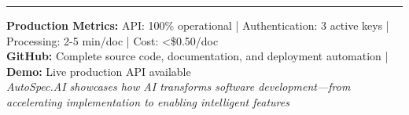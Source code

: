 \documentclass[11pt,letterpaper]{article}
\begin{document}
\vspace{6pt}
\hrule
\vspace{4pt}

\begin{center}
\small
\textbf{Production Metrics:} API: 100\% operational | Authentication: 3 active keys | Processing: 2-5 min/doc | Cost: <\$0.50/doc\\
\textbf{GitHub:} Complete source code, documentation, and deployment automation | \textbf{Demo:} Live production API available\\
\textit{AutoSpec.AI showcases how AI transforms software development—from accelerating implementation to enabling intelligent features}
\end{center}
\end{document}
